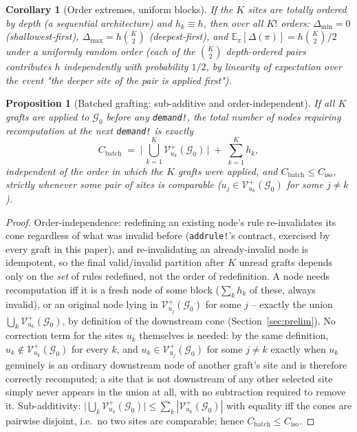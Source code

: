 \documentclass[11pt,a4paper]{article}
\newtheorem{proposition}{Proposition}
\newtheorem{corollary}{Corollary}
\newcommand{\G}{\mathcal{G}}
\newcommand{\V}{\mathcal{V}}
\begin{document}
\begin{corollary}[Order extremes, uniform blocks]
\label{cor:order-extremes}
If the $K$ sites are totally ordered by depth (a sequential architecture) and $h_k \equiv h$, then
over all $K!$ orders: $\Delta_{\min} = 0$ (shallowest-first), $\Delta_{\max} = h\binom{K}{2}$
(deepest-first), and $\mathbb{E}_\pi[\Delta(\pi)] = h\binom{K}{2}/2$ under a uniformly random order
(each of the $\binom{K}{2}$ depth-ordered pairs contributes $h$ independently with probability
$1/2$, by linearity of expectation over the event "the deeper site of the pair is applied first").
\end{corollary}

\begin{proposition}[Batched grafting: sub-additive and order-independent]
\label{prop:batched}
If all $K$ grafts are applied to $\G_0$ before any \texttt{demand!}, the total number of nodes
requiring recomputation at the next \texttt{demand!} is exactly
\[
C_{\mathrm{batch}} \;=\; \Big|\, \bigcup_{k=1}^{K} \V_{u_k}^{+}(\G_0) \,\Big| \;+\; \sum_{k=1}^K h_k,
\]
independent of the order in which the $K$ grafts were applied, and $C_{\mathrm{batch}} \le
C_{\mathrm{iso}}$, strictly whenever some pair of sites is comparable ($u_j \in \V_{u_k}^+(\G_0)$
for some $j \ne k$).
\end{proposition}

\begin{proof}
Order-independence: redefining an existing node's rule re-invalidates its cone regardless of what
was invalid before (\texttt{addrule!}'s contract, exercised by every graft in this paper), and
re-invalidating an already-invalid node is idempotent, so the final valid/invalid partition after
$K$ unread grafts depends only on the \emph{set} of rules redefined, not the order of redefinition.
A node needs recomputation iff it is a fresh node of some block ($\sum_k h_k$ of these, always
invalid), or an original node lying in $\V_{u_j}^+(\G_0)$ for some $j$ -- exactly the union
$\bigcup_k \V_{u_k}^+(\G_0)$, by definition of the downstream cone (Section~\ref{sec:prelim}). No
correction term for the sites $u_k$ themselves is needed: by the same definition, $u_k \notin
\V_{u_k}^+(\G_0)$ for every $k$, and $u_k \in \V_{u_j}^+(\G_0)$ for some $j \ne k$ exactly when
$u_k$ genuinely is an ordinary downstream node of another graft's site and is therefore correctly
recomputed; a site that is not downstream of any other selected site simply never appears in the
union at all, with no subtraction required to remove it. Sub-additivity: $\big|\bigcup_k
\V_{u_k}^+(\G_0)\big| \le \sum_k |\V_{u_k}^+(\G_0)|$ with equality iff the cones are pairwise
disjoint, i.e.\ no two sites are comparable; hence $C_{\mathrm{batch}} \le C_{\mathrm{iso}}$.
\end{proof}
\end{document}
